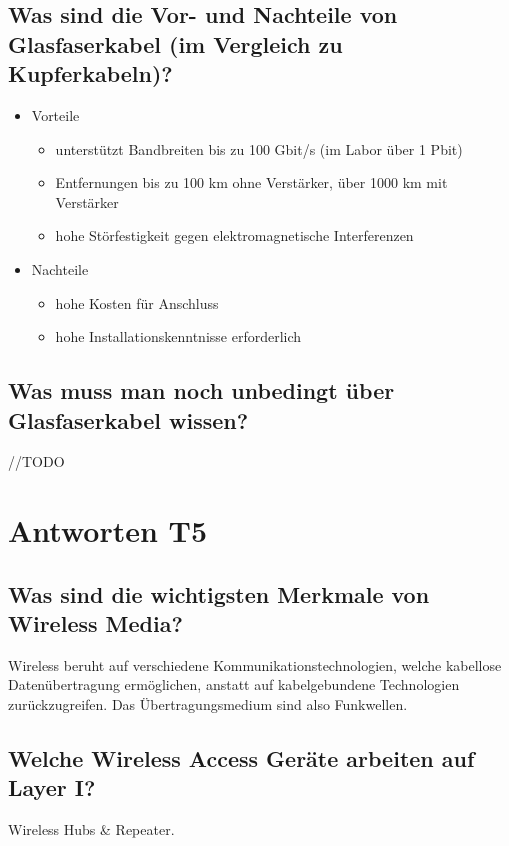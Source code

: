 \subsection*{Was sind die Vor- und Nachteile von Glasfaserkabel (im Vergleich zu Kupferkabeln)?}
\begin{itemize}
    \item Vorteile
    \begin{itemize}
        \item unterstützt Bandbreiten bis zu 100 Gbit/s (im Labor über 1 Pbit)
        \item Entfernungen bis zu 100 km ohne Verstärker, über 1000 km mit Verstärker
        \item hohe Störfestigkeit gegen elektromagnetische Interferenzen
    \end{itemize}
    \item Nachteile
    \begin{itemize}
        \item hohe Kosten für Anschluss
        \item hohe Installationskenntnisse erforderlich
    \end{itemize}
\end{itemize}

\subsection*{Was muss man noch unbedingt über Glasfaserkabel wissen?}
//TODO

\section{Antworten T5}
\subsection*{Was sind die wichtigsten Merkmale von \flqq{}Wireless Media\frqq?}
Wireless beruht auf verschiedene Kommunikationstechnologien, welche kabellose Datenübertragung ermöglichen, anstatt auf kabelgebundene Technologien zurückzugreifen. Das Übertragungsmedium sind also Funkwellen.

\subsection*{Welche Wireless Access Geräte arbeiten auf Layer I?}
Wireless Hubs \& Repeater.

